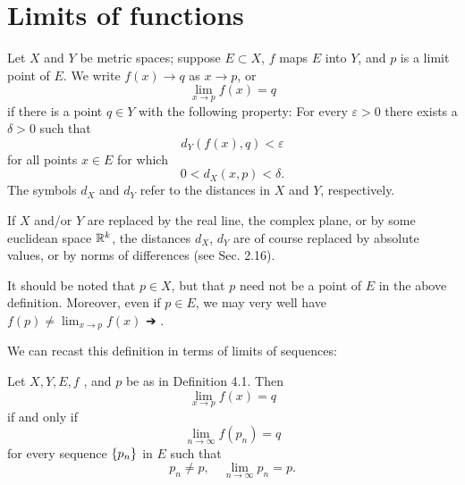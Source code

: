 \section{Limits of functions}

\begin{myDef}
    \label{myDef:4.1}
    Let $X$ and $Y$ be metric spaces; suppose $E \subset X$, $f$ maps $E$ into $Y$, and $p$ is a limit point of $E$. We write $f(x) \rightarrow q$ as $x \rightarrow p$, or
    \begin{equation}
        \label{eq:4.1}
        \lim_{x \to p} f(x) = q
    \end{equation}
    if there is a point $q \in Y$ with the following property: For every $\varepsilon > 0$ there exists a $\delta > 0$ such that
    \begin{equation}
        \label{eq:4.2}
        d_Y (f(x), q) < \varepsilon
    \end{equation}
    for all points $x \in E$ for which
    \begin{equation}
        \label{eq:4.3}
        0 < d_X (x, p) < \delta.
    \end{equation}
    The symbols $d_X$ and $d_Y$ refer to the distances in $X$ and $Y$,  respectively.
\end{myDef}

If $X$ and/or $Y$ are replaced by the real line, the complex plane, or by some euclidean space ${\protect\mathbb R}^{k}$, the distances $d_X$, $d_Y$ are of course replaced by absolute values, or by norms of differences (see Sec. 2.16).

It should be noted that $p \in X$, but that $p$ need not be a point of $E$ in the above definition. Moreover, even if $p \in E$, we may very well have $f(p) \neq \lim_{x \to p} f(x)$ ➔ .

We can recast this definition in terms of limits of sequences:

\begin{thm}
    \label{thm:4.2}
    Let $X,Y,E,f$ , and $p$ be as in Definition 4.1. Then
    \begin{equation}
        \label{eq:4.4}
        \lim_{x \to p} f(x) = q
    \end{equation}
    if and only if 
    \begin{equation}
        \label{eq:4.5}
        \lim_{n \to \infty} f(p_n) = q
    \end{equation}
    for every sequence $\protect\{p_n\}$ in $E$ such that
    \begin{equation}
        \label{eq:4.6}
        p_n \neq p, \quad
        \lim_{n \to \infty} p_n = p.
    \end{equation}
\end{thm}

